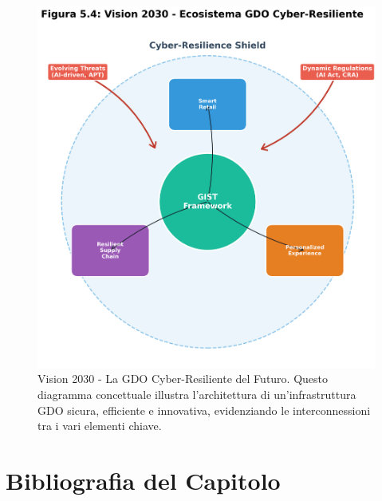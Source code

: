 \begin{figure}[htbp]
\centering
\includegraphics[width=1\textwidth]{thesis_figures/cap5/figura_5_4_vision_2030_matplotlib.png}
\caption{Vision 2030 - La GDO Cyber-Resiliente del Futuro. Questo diagramma concettuale illustra l'architettura di un'infrastruttura GDO sicura, efficiente e innovativa, evidenziando le interconnessioni tra i vari elementi chiave.}
\label{fig:vision_2030}
\end{figure}


\section{Bibliografia del Capitolo}
\printbibliography[heading=none] %


































